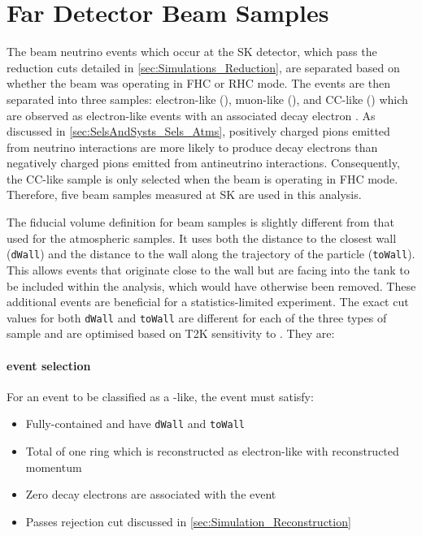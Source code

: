 \section{Far Detector Beam Samples}
\label{sec:SelsAndSysts_Sels_FD}

The beam neutrino events which occur at the SK detector, which pass the reduction cuts detailed in \autoref{sec:Simulations_Reduction}, are separated based on whether the beam was operating in FHC or RHC mode. The events are then separated into three samples: electron-like (), muon-like (), and CC\quickmath{1\pi^{+}}-like () which are observed as electron-like events with an associated decay electron \cite{t2k_tn_399}. As discussed in \autoref{sec:SelsAndSysts_Sels_Atms}, positively charged pions emitted from neutrino interactions are more likely to produce decay electrons than negatively charged pions emitted from antineutrino interactions. Consequently, the CC\quickmath{1\pi^{+}}-like sample is only selected when the beam is operating in FHC mode. Therefore, five beam samples measured at SK are used in this analysis.

The fiducial volume definition for beam samples is slightly different from that used for the atmospheric samples.  It uses both the distance to the closest wall (\texttt{dWall}) and the distance to the wall along the trajectory of the particle (\texttt{toWall}). This allows events that originate close to the wall but are facing into the tank to be included within the analysis, which would have otherwise been removed. These additional events are beneficial for a statistics-limited experiment. The exact cut values for both \texttt{dWall} and \texttt{toWall} are different for each of the three types of sample and are optimised based on T2K sensitivity to  \cite{t2k_tn_318, t2k_tn_319}. They are:

\paragraph{ event selection}

For an event to be classified as a -like, the event must satisfy:

\begin{itemize}
\item Fully-contained and have \texttt{dWall}  and \texttt{toWall} 
\item Total of one ring which is reconstructed as electron-like with reconstructed momentum 
\item Zero decay electrons are associated with the event
\item Passes  rejection cut discussed in \autoref{sec:Simulation_Reconstruction}
\end{itemize}

